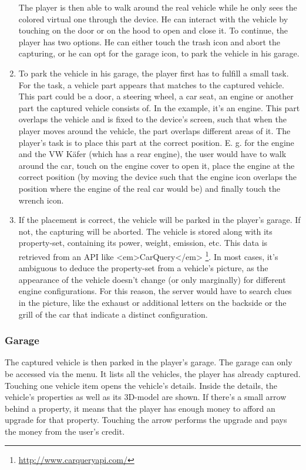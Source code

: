 \begin{enumerate}
The player is then able to walk around the real vehicle while he only sees the colored virtual one through the device. He can interact with the vehicle by touching on the door or on the hood to open and close it. To continue, the player has two options. He can either touch the trash icon and abort the capturing, or he can opt for the garage icon, to park the vehicle in his garage.
  \item To park the vehicle in his garage, the player first has to fulfill a small task. For the task, a vehicle part appears that matches to the captured vehicle. This part could be a door, a steering wheel, a car seat, an engine or another part the captured vehicle consists of. In the example, it’s an engine. This part overlaps the vehicle and is fixed to the device's screen, such that when the player moves around the vehicle, the part overlaps different areas of it. The player's task is to place this part at the correct position. E. g. for the engine and the VW K\"afer (which has a rear engine), the user would have to walk around the car, touch on the engine cover to open it, place the engine at the correct position (by moving the device such that the engine icon overlaps the position where the engine of the real car would be) and finally touch the wrench icon.
  \item If the placement is correct, the vehicle will be parked in the player's garage. If not, the capturing will be aborted. The vehicle is stored along with its property-set, containing its power, weight, emission, etc. This data is retrieved from an API like <em>CarQuery</em> \footnote{\url{http://www.carqueryapi.com/}}. In most cases, it's ambiguous to deduce the property-set from a vehicle's picture, as the appearance of the vehicle doesn't change (or only marginally) for different engine configurations. For this reason, the server would have to search clues in the picture, like the exhaust or additional letters on the backside or the grill of the car that indicate a distinct configuration.
\end{enumerate}

\subsubsection{Garage}
The captured vehicle is then parked in the player’s garage. The garage can only be accessed via the menu. It lists all the vehicles, the player has already captured. Touching one vehicle item opens the vehicle’s details. Inside the details, the vehicle’s properties as well as its 3D-model are shown. If there’s a small arrow behind a property, it means that the player has enough money to afford an upgrade for that property. Touching the arrow performs the upgrade and pays the money from the user's credit.

